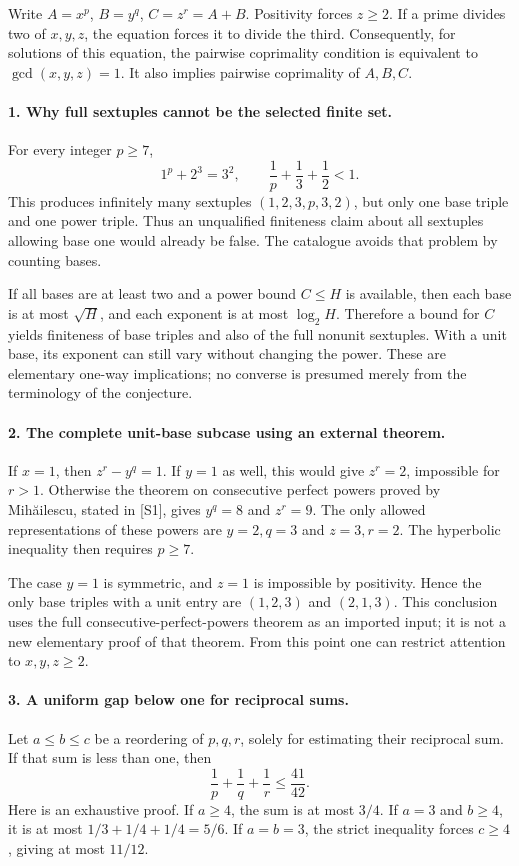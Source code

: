 \documentclass[11pt]{article}
\begin{document}
Write $A=x^p$, $B=y^q$, $C=z^r=A+B$. Positivity forces $z\ge2$. If a prime divides two of $x,y,z$, the equation forces it to divide the third. Consequently, for solutions of this equation, the pairwise coprimality condition is equivalent to $\gcd(x,y,z)=1$. It also implies pairwise coprimality of $A,B,C$.

\paragraph{1. Why full sextuples cannot be the selected finite set.}
For every integer $p\ge7$,
\[
 1^p+2^3=3^2,\qquad \frac1p+\frac13+\frac12<1.
\]
This produces infinitely many sextuples $(1,2,3,p,3,2)$, but only one base triple and one power triple. Thus an unqualified finiteness claim about all sextuples allowing base one would already be false. The catalogue avoids that problem by counting bases.

If all bases are at least two and a power bound $C\le H$ is available, then each base is at most $\sqrt H$, and each exponent is at most $\log_2 H$. Therefore a bound for $C$ yields finiteness of base triples and also of the full nonunit sextuples. With a unit base, its exponent can still vary without changing the power. These are elementary one-way implications; no converse is presumed merely from the terminology of the conjecture.

\paragraph{2. The complete unit-base subcase using an external theorem.}
If $x=1$, then $z^r-y^q=1$. If $y=1$ as well, this would give $z^r=2$, impossible for $r>1$. Otherwise the theorem on consecutive perfect powers proved by Mihăilescu, stated in [S1], gives $y^q=8$ and $z^r=9$. The only allowed representations of these powers are $y=2,q=3$ and $z=3,r=2$. The hyperbolic inequality then requires $p\ge7$.

The case $y=1$ is symmetric, and $z=1$ is impossible by positivity. Hence the only base triples with a unit entry are $(1,2,3)$ and $(2,1,3)$. This conclusion uses the full consecutive-perfect-powers theorem as an imported input; it is not a new elementary proof of that theorem. From this point one can restrict attention to $x,y,z\ge2$.

\paragraph{3. A uniform gap below one for reciprocal sums.}
Let $a\le b\le c$ be a reordering of $p,q,r$, solely for estimating their reciprocal sum. If that sum is less than one, then
\[
 \frac1p+\frac1q+\frac1r\le\frac{41}{42}.
\]
Here is an exhaustive proof. If $a\ge4$, the sum is at most $3/4$. If $a=3$ and $b\ge4$, it is at most $1/3+1/4+1/4=5/6$. If $a=b=3$, the strict inequality forces $c\ge4$, giving at most $11/12$.
\end{document}
